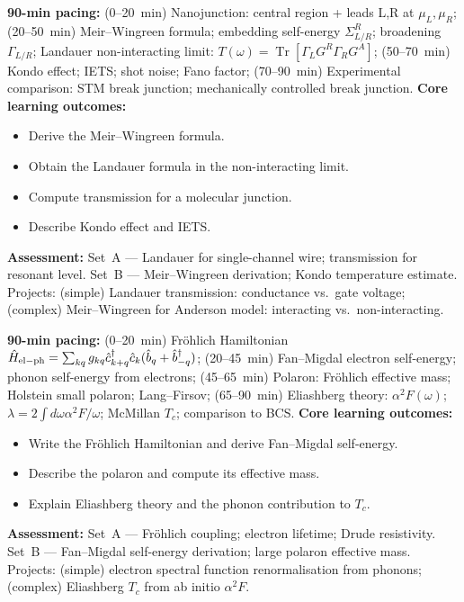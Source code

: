 \documentclass[11pt,a4paper]{article}
\begin{document}
\medskip

\begin{tcolorbox}[modulebox, title={Module~II.5 / L08: Steady-State Transport}]
\textbf{90-min pacing:} (0--20~min) Nanojunction: central region + leads L,R at $\mu_L,\mu_R$; (20--50~min) Meir--Wingreen formula; embedding self-energy $\Sigma^R_{L/R}$; broadening $\Gamma_{L/R}$; Landauer non-interacting limit: $T(\omega)=\operatorname{Tr}[\Gamma_L G^R\Gamma_R G^A]$; (50--70~min) Kondo effect; IETS; shot noise; Fano factor; (70--90~min) Experimental comparison: STM break junction; mechanically controlled break junction.
\medskip\textbf{Core learning outcomes:}
\begin{itemize}[leftmargin=1.4em,topsep=2pt,itemsep=1pt]
  \item Derive the Meir--Wingreen formula.
  \item Obtain the Landauer formula in the non-interacting limit.
  \item Compute transmission for a molecular junction.
  \item Describe Kondo effect and IETS.
\end{itemize}
\medskip\textbf{Assessment:}
Set~A --- Landauer for single-channel wire; transmission for resonant level.
Set~B --- Meir--Wingreen derivation; Kondo temperature estimate.
Projects: (simple) Landauer transmission: conductance vs.\ gate voltage; (complex) Meir--Wingreen for Anderson model: interacting vs.\ non-interacting.
\end{tcolorbox}

\medskip

\begin{tcolorbox}[modulebox, title={Module~II.5 / L09: Electron--Phonon Coupling}]
\textbf{90-min pacing:} (0--20~min) Fr\"ohlich Hamiltonian $\hat{H}_{\rm el-ph}=\sum_{kq}g_{kq}\hat{c}^\dagger_{k+q}\hat{c}_k(\hat{b}_q+\hat{b}^\dagger_{-q})$; (20--45~min) Fan--Migdal electron self-energy; phonon self-energy from electrons; (45--65~min) Polaron: Fr\"ohlich effective mass; Holstein small polaron; Lang--Firsov; (65--90~min) Eliashberg theory: $\alpha^2F(\omega)$; $\lambda=2\int d\omega\alpha^2F/\omega$; McMillan $T_c$; comparison to BCS.
\medskip\textbf{Core learning outcomes:}
\begin{itemize}[leftmargin=1.4em,topsep=2pt,itemsep=1pt]
  \item Write the Fr\"ohlich Hamiltonian and derive Fan--Migdal self-energy.
  \item Describe the polaron and compute its effective mass.
  \item Explain Eliashberg theory and the phonon contribution to $T_c$.
\end{itemize}
\medskip\textbf{Assessment:}
Set~A --- Fr\"ohlich coupling; electron lifetime; Drude resistivity.
Set~B --- Fan--Migdal self-energy derivation; large polaron effective mass.
Projects: (simple) electron spectral function renormalisation from phonons; (complex) Eliashberg $T_c$ from ab initio $\alpha^2F$.
\end{tcolorbox}
\end{document}
